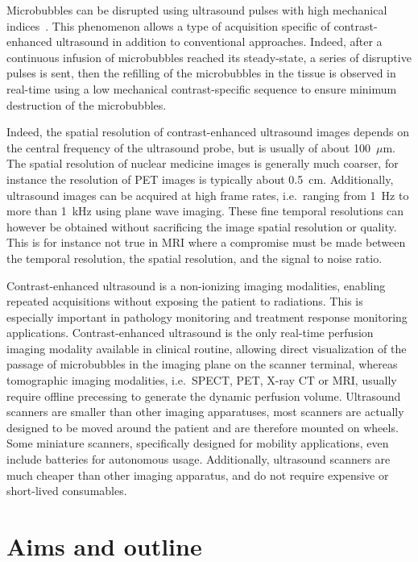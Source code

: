 Microbubbles can be disrupted using ultrasound pulses with high mechanical indices~\cite{Tiemann:1999vy}.
This phenomenon allows a type of acquisition specific of contrast-enhanced ultrasound in addition to conventional approaches. 
Indeed, after a continuous infusion of microbubbles reached its steady-state, a series of disruptive pulses is sent, then the refilling of the microbubbles in the tissue is observed in real-time using a low mechanical contrast-specific sequence to ensure minimum destruction of the microbubbles.

Indeed, the spatial resolution of contrast-enhanced ultrasound images depends on the central frequency of the ultrasound probe, but is usually of about 100~$\mu$m.
The spatial resolution of nuclear medicine images is generally much coarser, for instance the resolution of PET images is typically about 0.5~cm.
Additionally, ultrasound images can be acquired at high frame rates, i.e.~ranging from 1~Hz to more than 1~kHz using plane wave imaging.
These fine temporal resolutions can however be obtained without sacrificing the image spatial resolution or quality. 
This is for instance not true in MRI where a compromise must be made between the temporal resolution, the spatial resolution, and the signal to noise ratio.

Contrast-enhanced ultrasound is a non-ionizing imaging modalities, enabling repeated acquisitions without exposing the patient to radiations.
This is especially important in pathology monitoring and treatment response monitoring applications.
Contrast-enhanced ultrasound is the only real-time perfusion imaging modality available in clinical routine, allowing direct visualization of the passage of microbubbles in the imaging plane on the scanner terminal, whereas tomographic imaging modalities, i.e.~SPECT, PET, X-ray CT or MRI, usually require offline precessing to generate the dynamic perfusion volume.
Ultrasound scanners are smaller than other imaging apparatuses, most scanners are actually designed to be moved around the patient and are therefore mounted on wheels.
Some miniature scanners, specifically designed for mobility applications, even include batteries for autonomous usage.
Additionally, ultrasound scanners are much cheaper than other imaging apparatus, and do not require expensive or short-lived consumables.

\section{Aims and outline}
\label{sec:IntroAimsOutline}
